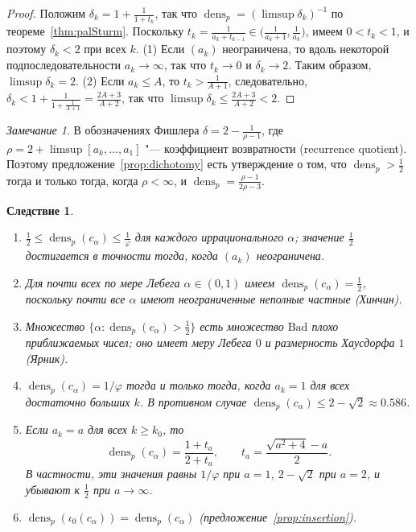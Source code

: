\documentclass[a4paper,14pt]{extreport}
\theoremstyle{plain}
\newtheorem{corollary}[theorem]{Следствие}
\theoremstyle{definition}
\theoremstyle{remark}
\newtheorem{remark}{Замечание}
\begin{document}
\begin{proof}
	Положим $\delta_k=1+\frac1{1+t_k}$, так что $\operatorname{dens}_p=(\limsup\delta_k)^{-1}$ по теореме~\ref{thm:palSturm}.
	Поскольку $t_k=\frac1{a_k+t_{k-1}}\in\bigl(\frac1{a_k+1},\frac1{a_k}\bigr)$, имеем $0<t_k<1$, и поэтому $\delta_k<2$ при всех $k$.
	(1) Если $(a_k)$ неограничена, то вдоль некоторой подпоследовательности $a_k\to\infty$, так что $t_k\to0$ и $\delta_k\to2$. Таким образом, $\limsup\delta_k=2$.
	(2) Если $a_k\le A$, то $t_k>\frac1{A+1}$, следовательно, $\delta_k<1+\frac{1}{1+\frac1{A+1}}=\frac{2A+3}{A+2}$, так что $\limsup\delta_k\le\frac{2A+3}{A+2}<2$.
\end{proof}

\begin{remark}
	В обозначениях Фишлера $\delta=2-\frac1{\rho-1}$, где $\rho=2+\limsup[a_k,\dots,a_1]$ "--- коэффициент возвратности (recurrence quotient). Поэтому предложение~\ref{prop:dichotomy} есть утверждение о том, что $\operatorname{dens}_p>\frac12$ тогда и только тогда, когда $\rho<\infty$, и $\operatorname{dens}_p=\frac{\rho-1}{2\rho-3}$.
\end{remark}

\begin{corollary}\label{cor:palSturm}
	\begin{enumerate}
		\item $\tfrac12\le\operatorname{dens}_p(c_\alpha)\le\tfrac1\varphi$ для каждого иррационального $\alpha$; значение $\tfrac12$ достигается в точности тогда, когда $(a_k)$ неограничена.
		\item Для почти всех по мере Лебега $\alpha\in(0,1)$ имеем $\operatorname{dens}_p(c_\alpha)=\tfrac12$, поскольку почти все $\alpha$ имеют неограниченные неполные частные (Хинчин).
		\item Множество $\{\alpha:\operatorname{dens}_p(c_\alpha)>\tfrac12\}$ есть множество $\mathrm{Bad}$ плохо приближаемых чисел; оно имеет меру Лебега $0$ и размерность Хаусдорфа $1$ (Ярник).
		\item $\operatorname{dens}_p(c_\alpha)=1/\varphi$ тогда и только тогда, когда $a_k=1$ для всех достаточно больших $k$. В противном случае $\operatorname{dens}_p(c_\alpha)\le 2-\sqrt2\approx0.586$.
		\item Если $a_k=a$ для всех $k\ge k_0$, то
		\begin{equation}
			\operatorname{dens}_p(c_\alpha)=\frac{1+t_a}{2+t_a},\qquad t_a=\frac{\sqrt{a^2+4}-a}{2}.
		\end{equation}
		В частности, эти значения равны $1/\varphi$ при $a=1$, $2-\sqrt2$ при $a=2$, и убывают к $\tfrac12$ при $a\to\infty$.
		\item $\operatorname{dens}_p(\iota_0(c_\alpha))=\operatorname{dens}_p(c_\alpha)$ (предложение~\ref{prop:insertion}).
	\end{enumerate}
\end{corollary}
\end{document}
